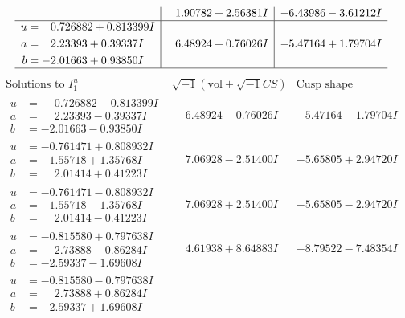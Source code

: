 \documentclass[1p]{elsarticle_modified}
\theoremstyle{definition}
\newcommand{\I}{\sqrt{-1}}
\begin{document}
$$\begin{array}{c|c|c}
 & \phantom{-}1.90782 + 2.56381 I & -6.43986 - 3.61212 I \\ \hline\begin{aligned}
u &= \phantom{-}0.726882 + 0.813399 I \\
a &= \phantom{-}2.23393 + 0.39337 I \\
b &= -2.01663 + 0.93850 I\end{aligned}
 & \phantom{-}6.48924 + 0.76026 I & -5.47164 + 1.79704 I\\
 \hline 
 \end{array}$$\newpage$$\begin{array}{c|c|c}  
\text{Solutions to }I^u_{1}& \I (\text{vol} + \sqrt{-1}CS) & \text{Cusp shape}\\
 \hline 
\begin{aligned}
u &= \phantom{-}0.726882 - 0.813399 I \\
a &= \phantom{-}2.23393 - 0.39337 I \\
b &= -2.01663 - 0.93850 I\end{aligned}
 & \phantom{-}6.48924 - 0.76026 I & -5.47164 - 1.79704 I \\ \hline\begin{aligned}
u &= -0.761471 + 0.808932 I \\
a &= -1.55718 + 1.35768 I \\
b &= \phantom{-}2.01414 + 0.41223 I\end{aligned}
 & \phantom{-}7.06928 - 2.51400 I & -5.65805 + 2.94720 I \\ \hline\begin{aligned}
u &= -0.761471 - 0.808932 I \\
a &= -1.55718 - 1.35768 I \\
b &= \phantom{-}2.01414 - 0.41223 I\end{aligned}
 & \phantom{-}7.06928 + 2.51400 I & -5.65805 - 2.94720 I \\ \hline\begin{aligned}
u &= -0.815580 + 0.797638 I \\
a &= \phantom{-}2.73888 - 0.86284 I \\
b &= -2.59337 - 1.69608 I\end{aligned}
 & \phantom{-}4.61938 + 8.64883 I & -8.79522 - 7.48354 I \\ \hline\begin{aligned}
u &= -0.815580 - 0.797638 I \\
a &= \phantom{-}2.73888 + 0.86284 I \\
b &= -2.59337 + 1.69608 I\end{aligned}

\end{array}$$
\end{document}
